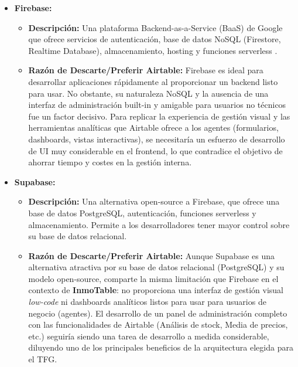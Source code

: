 \begin{enumerate}
\begin{itemize}
\begin{itemize}
            \item \textbf{Firebase:}
            \begin{itemize}
                \item \textbf{Descripción:} Una plataforma Backend-as-a-Service (BaaS) de Google que ofrece servicios de autenticación, base de datos NoSQL (Firestore, Realtime Database), almacenamiento, hosting y funciones serverless \cite{back4app2024firebase}.
                \item \textbf{Razón de Descarte/Preferir Airtable:} Firebase es ideal para desarrollar aplicaciones rápidamente al proporcionar un backend listo para usar. No obstante, su naturaleza NoSQL y la ausencia de una interfaz de administración built-in y amigable para usuarios no técnicos fue un factor decisivo. Para replicar la experiencia de gestión visual y las herramientas analíticas que Airtable ofrece a los agentes (formularios, dashboards, vistas interactivas), se necesitaría un esfuerzo de desarrollo de UI muy considerable en el frontend, lo que contradice el objetivo de ahorrar tiempo y costes en la gestión interna.
            \end{itemize}

            \item \textbf{Supabase:}
            \begin{itemize}
                \item \textbf{Descripción:} Una alternativa open-source a Firebase, que ofrece una base de datos PostgreSQL, autenticación, funciones serverless y almacenamiento. Permite a los desarrolladores tener mayor control sobre su base de datos relacional.
                \item \textbf{Razón de Descarte/Preferir Airtable:} Aunque Supabase es una alternativa atractiva por su base de datos relacional (PostgreSQL) y su modelo open-source, comparte la misma limitación que Firebase en el contexto de \textbf{InmoTable}: no proporciona una interfaz de gestión visual \textit{low-code} ni dashboards analíticos listos para usar para usuarios de negocio (agentes). El desarrollo de un panel de administración completo con las funcionalidades de Airtable (Análisis de stock, Media de precios, etc.) seguiría siendo una tarea de desarrollo a medida considerable, diluyendo uno de los principales beneficios de la arquitectura elegida para el TFG.
            \end{itemize}

        \end{itemize}

    \end{itemize}

\end{enumerate}
    
